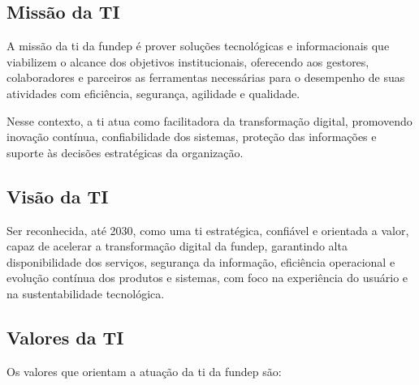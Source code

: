 \documentclass[12pt,a4paper]{article}
\begin{document}
\subsection{Missão da TI}

A missão da \gls{ti} da \gls{fundep} é prover soluções tecnológicas e informacionais que viabilizem o alcance dos objetivos institucionais, oferecendo aos gestores, colaboradores e parceiros as ferramentas necessárias para o desempenho de suas atividades com eficiência, segurança, agilidade e qualidade.

Nesse contexto, a \gls{ti} atua como facilitadora da transformação digital, promovendo inovação contínua, confiabilidade dos sistemas, proteção das informações e suporte às decisões estratégicas da organização.

\subsection{Visão da TI}

Ser reconhecida, até 2030, como uma \gls{ti} estratégica, confiável e orientada a valor, capaz de acelerar a transformação digital da \gls{fundep}, garantindo alta disponibilidade dos serviços, segurança da informação, eficiência operacional e evolução contínua dos produtos e sistemas, com foco na experiência do usuário e na sustentabilidade tecnológica.

\subsection{Valores da TI}

Os valores que orientam a atuação da \gls{ti} da \gls{fundep} são:
\end{document}
